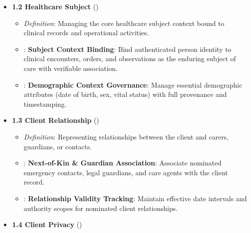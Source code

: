 \begin{itemize}
\begin{itemize}
\end{itemize}


\item
\textbf{1.2 Healthcare Subject} (\texttt{})


\begin{itemize}

\item
\emph{Definition}: Managing the core healthcare subject context bound to clinical records and operational activities.



\item
\texttt{}: \textbf{Subject Context Binding}: Bind authenticated person identity to clinical encounters, orders, and observations as the enduring subject of care with verifiable association.



\item
\texttt{}: \textbf{Demographic Context Governance}: Manage essential demographic attributes (date of birth, sex, vital status) with full provenance and timestamping.



\end{itemize}


\item
\textbf{1.3 Client Relationship} (\texttt{})


\begin{itemize}

\item
\emph{Definition}: Representing relationships between the client and carers, guardians, or contacts.



\item
\texttt{}: \textbf{Next-of-Kin \& Guardian Association}: Associate nominated emergency contacts, legal guardians, and care agents with the client record.



\item
\texttt{}: \textbf{Relationship Validity Tracking}: Maintain effective date intervals and authority scopes for nominated client relationships.



\end{itemize}


\item
\textbf{1.4 Client Privacy} (\texttt{})



\end{itemize}
